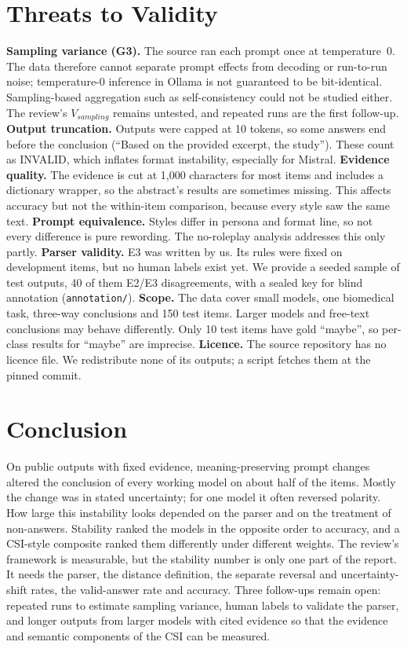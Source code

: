 \documentclass[acmsmall]{acmart}
\begin{document}
\section{Threats to Validity}\label{sec:threats}
\textbf{Sampling variance (G3).} The source ran each prompt once at temperature~0. The data therefore cannot separate prompt effects from decoding or run-to-run noise; temperature-0 inference in Ollama is not guaranteed to be bit-identical. Sampling-based aggregation such as self-consistency \cite{wang2023selfconsistency} could not be studied either. The review's $V_{sampling}$ remains untested, and repeated runs are the first follow-up. \textbf{Output truncation.} Outputs were capped at 10 tokens, so some answers end before the conclusion (``Based on the provided excerpt, the study''). These count as INVALID, which inflates format instability, especially for Mistral. \textbf{Evidence quality.} The evidence is cut at 1,000 characters for most items and includes a dictionary wrapper, so the abstract's results are sometimes missing. This affects accuracy but not the within-item comparison, because every style saw the same text. \textbf{Prompt equivalence.} Styles differ in persona and format line, so not every difference is pure rewording. The no-roleplay analysis addresses this only partly. \textbf{Parser validity.} E3 was written by us. Its rules were fixed on development items, but no human labels exist yet. We provide a seeded sample of \AnnN{} test outputs, 40 of them E2/E3 disagreements, with a sealed key for blind annotation (\texttt{annotation/}). \textbf{Scope.} The data cover small models, one biomedical task, three-way conclusions and 150 test items. Larger models and free-text conclusions may behave differently. Only 10 test items have gold ``maybe'', so per-class results for ``maybe'' are imprecise. \textbf{Licence.} The source repository has no licence file. We redistribute none of its outputs; a script fetches them at the pinned commit.

\section{Conclusion}\label{sec:conclusion}
On public outputs with fixed evidence, meaning-preserving prompt changes altered the conclusion of every working model on about half of the items. Mostly the change was in stated uncertainty; for one model it often reversed polarity. How large this instability looks depended on the parser and on the treatment of non-answers. Stability ranked the models in the opposite order to accuracy, and a CSI-style composite ranked them differently under different weights. The review's framework is measurable, but the stability number is only one part of the report. It needs the parser, the distance definition, the separate reversal and uncertainty-shift rates, the valid-answer rate and accuracy. Three follow-ups remain open: repeated runs to estimate sampling variance, human labels to validate the parser, and longer outputs from larger models with cited evidence so that the evidence and semantic components of the CSI can be measured.
\end{document}
